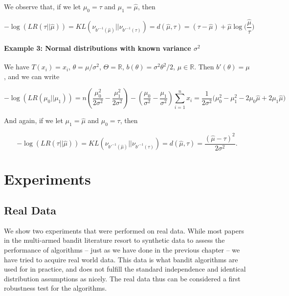 \documentclass[12pt,]{article}
\let\oldparagraph\paragraph
\renewcommand{\paragraph}[1]{\oldparagraph{#1}\mbox{}}
\begin{document}
We observe that, if we let \(\mu_0 = \tau\) and \(\mu_1 = \hat{\mu}\),
then

\[
-\log(LR(\tau||\hat{\mu})) = KL(\nu_{b'^{-1}(\hat{\mu})}||\nu_{b'^{-1}(\tau)}) = d(\hat{\mu},\tau) = (\tau - \hat{\mu}) + \hat{\mu}\log\Big(\frac{\hat{\mu}}{\tau}\Big)
\]

\paragraph{\texorpdfstring{Example 3: Normal distributions with known
variance
\(\sigma^2\)}{Example 3: Normal distributions with known variance \textbackslash{}sigma\^{}2}}\label{example-3-normal-distributions-with-known-variance-sigma2}

We have \(T(x_i) = x_i\), \(\theta = \mu/\sigma^2\),
\(\Theta = \mathbb{R}\), \(b(\theta) = \sigma^2\theta^2/2\),
\(\mu \in \mathbb{R}\). Then \(b'(\theta) = \mu\), and we can write

\[
-\log(LR(\mu_0||\mu_1)) = n (\frac{\mu_0^2}{2\sigma^2} - \frac{\mu_1^2}{2\sigma^2}) - (\frac{\mu_0}{\sigma^2} - \frac{\mu_1}{\sigma^2})\sum_{i=1}^nx_i = \frac{1}{2\sigma^2}\Big(\mu_0^2-\mu_1^2 - 2\mu_0\hat{\mu} + 2\mu_1\hat{\mu}\Big)
\]

And again, if we let \(\mu_1 = \hat{\mu}\) and \(\mu_0 = \tau\), then

\[
-\log(LR(\tau||\hat{\mu})) = KL(\nu_{b'^{-1}(\hat{\mu})}||\nu_{b'^{-1}(\tau)}) = d(\hat{\mu},\tau) = \frac{(\hat{\mu} - \tau)^2}{2\sigma^2}.
\]

\section{Experiments}\label{experiments}

\subsection{Real Data}\label{real-data}

We show two experiments that were performed on real data. While most
papers in the multi-armed bandit literature resort to synthetic data to
assess the performance of algorithms -- just as we have done in the
previous chapter -- we have tried to acquire real world data. This data
is what bandit algorithms are used for in practice, and does not fulfill
the standard independence and identical distribution assumptions as
nicely. The real data thus can be considered a first robustness test for
the algorithms.
\end{document}
